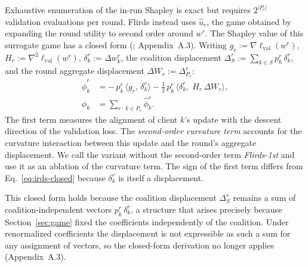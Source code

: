 \documentclass[letterpaper]{article} %
\theoremstyle{definition} %
\newcommand{\lval}{\ell_{\mathrm{val}}} %
\begin{document}
Exhaustive enumeration of the in-run Shapley is exact but requires
$2^{|P_r|}$ validation evaluations per round. Flirds instead uses
$\hat u_r$, the game obtained by expanding the round utility to second order
around $w^r$. The Shapley value of this surrogate game has a closed form
(\citealp{wang2025data}; Appendix~A.3). Writing
$g_r := \nabla \lval(w^r)$, $H_r := \nabla^2 \lval(w^r)$,
$\delta_k^r := \Delta w_k^r$, the coalition displacement
$\Delta_S^r := \sum_{k \in S} p_k^r\, \delta_k^r$, and the round aggregate displacement
$\Delta W_r := \Delta_{P_r}^r$:
\begin{equation}\label{eq:closed}
\begin{split}
\hat\phi_k^{r} &= -\,p_k^r\, \big\langle g_r,\, \delta_k^r \big\rangle - \tfrac{1}{2}\, p_k^r\, \big\langle \delta_k^r,\; H_r\, \Delta W_r \big\rangle, 
\\ 
\hat\phi_k &= \sum_{r\,:\,k\in P_r} \hat\phi_k^{r}.
\end{split}
\end{equation}
The first term measures the alignment of client $k$'s update with the descent
direction of the validation loss. The \emph{second-order curvature term}
accounts for the curvature interaction between this update and the round's
aggregate displacement. We call the variant without the second-order term
\emph{Flirds-1st} and use it as an ablation of the curvature term. The sign of
the first term differs from Eq.~\eqref{eq:irds-closed} because
$\delta_k^r$ is itself a displacement.

This closed form holds because the coalition displacement $\Delta_S^r$ remains
a sum of coalition-independent vectors $p_k^r\,\delta_k^r$, a structure that
arises precisely because Section~\ref{sec:game} fixed the coefficients
independently of the coalition. Under renormalized coefficients the displacement
is not expressible as such a sum for any assignment of vectors, so the
closed-form derivation no longer applies (Appendix~A.3).

\end{document}
